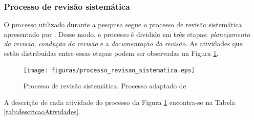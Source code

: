 	 \subsubsection{Processo de revisão sistemática}

	 	O processo utilizado durante a pesquisa segue o processo de revisão sistemática apresentado por \cite{Kitchenham}. Desse modo, o processo é dividido em três etapas: \textit{planejamento da revisão}, \textit{condução da revisão} e a \textit{documentação da revisão}. As atividades que estão distribuídas entre essas etapas podem ser observadas na Figura \ref{img:processo_revisao_sistematica}.

	 	\begin{figure}[H]
			\centering
			\texttt{[image: figuras/processo\_revisao\_sistematica.eps]}
			\caption[Processo de revisão sistemática]{Processo de revisão sistemática. Processo adaptado de \cite{Kitchenham}}
			\label{img:processo_revisao_sistematica}
		\end{figure}
		\clearpage

		A descrição de cada atividade do processo da Figura \ref{img:processo_revisao_sistematica} encontra-se na Tabela \ref{tab:descricaoAtividades}.


